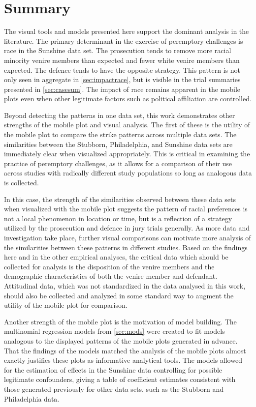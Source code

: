 \chapter{Summary}
\label{c:summary}

The visual tools and models presented here support the dominant analysis in the literature. The primary determinant in the
exercise of peremptory challenges is race in the Sunshine data set. The prosecution tends to remove more racial minority venire
members than expected and fewer white venire members than expected. The defence tends to have the
opposite strategy. This pattern is not only seen in aggregate in \ref{sec:impactrace}, but is visible in the trial summaries
presented in \ref{sec:casesum}. The impact of race remains apparent in the mobile plots even when other legitimate factors
such as political affiliation are controlled.

Beyond detecting the patterns in one data set, this work demonstrates other strengths of the mobile plot and visual
analysis. The first of these is the utility of the mobile plot to compare the strike patterns across multiple data sets. The
similarities between the Stubborn, Philadelphia, and Sunshine data sets are immediately clear when visualized appropriately. This
is critical in examining the practice of peremptory challenges, as it allows for a comparison of their use across studies with
radically different study populations so long as analogous data is collected.

In this case, the strength of the similarities observed between these data sets when visualized with the mobile plot suggests the
pattern of racial preferences is not a local phenomenon in location or time, but is a reflection of a strategy utilized by the
prosecution and defence in jury trials generally. As more data and investigation take place, further visual comparisons can
motivate more analysis of the similarities between these patterns in different studies. Based on the findings here and in the
other empirical analyses, the critical data which should be collected for analysis is the disposition of the venire members and
the demographic characteristics of both the venire member and
defendant. Attitudinal data, which was not standardized in the data
analysed in this work, should also be collected and analyzed in some standard way to augment the utility of the mobile plot for comparison.

Another strength of the mobile plot is the motivation of model building. The multinomial regression models from \ref{sec:mods}
were created to fit models analogous to the displayed patterns of the mobile plots generated in advance. That the findings of the
models matched the analysis of the mobile plots almost exactly justifies these plots as informative analytical tools. The models
allowed for the estimation of effects in the Sunshine data controlling for possible legitimate confounders, giving a table of
coefficient estimates consistent with those generated previously for other data sets, such as the Stubborn and Philadelphia data.


